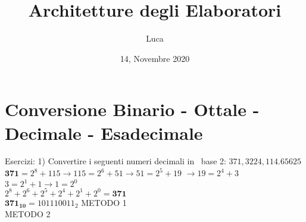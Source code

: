 \documentclass[a4paper, 12pt]{article} %
\begin{document}
\title{\huge{\textbf{Architetture degli Elaboratori}}}
\author{Luca}
\date{14, Novembre 2020}

\maketitle	

\pagebreak


\let\cleardoublepage\clearpage
\tableofcontents
{}
\setcounter{page}{2}


\fancyhf{}
\begin{comment}
\renewcommand{\headrulewidth}{2pt}
\renewcommand{\footrulewidth}{1pt}
\fancyhead[LE]{\leftmark}
\fancyhead[RO]{\nouppercase{\rightmark}}
\fancyfoot[LE, RO]{\thepage}
\end{comment}


\newpage

\section{Conversione Binario - Ottale - Decimale - Esadecimale}


\textsf{\large{\color{red} Esercizi: 1) Convertire i seguenti numeri decimali in \
		base 2: $371, 3224, 114.65625$}} \\

$\mathbf{371} = 2^8 + 115 \rightarrow 115 = 2^6 + 51 \rightarrow 51 = 2^5 + 19$ $\rightarrow 19 = 2^4 + 3$ \\ $3 = 2^1 + 1 \rightarrow 1 = 2^0 $ \\
$ 2^8 + 2^6 + 2^5 + 2^4 + 2^1 + 2^0 = \mathbf{371} $ \\
$ \mathbf{371_{10}} = 101110011_2 $ \hspace{0.3cm} \textrm{\color{red} METODO 1}
\\
\textrm{\color{red} METODO 2} \\
\end{document}

